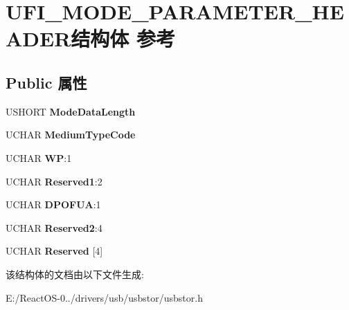 \hypertarget{struct_u_f_i___m_o_d_e___p_a_r_a_m_e_t_e_r___h_e_a_d_e_r}{}\section{U\+F\+I\+\_\+\+M\+O\+D\+E\+\_\+\+P\+A\+R\+A\+M\+E\+T\+E\+R\+\_\+\+H\+E\+A\+D\+E\+R结构体 参考}
\label{struct_u_f_i___m_o_d_e___p_a_r_a_m_e_t_e_r___h_e_a_d_e_r}
\subsection*{Public 属性}
\begin{DoxyCompactItemize}
\item 
\mbox{\label{struct_u_f_i___m_o_d_e___p_a_r_a_m_e_t_e_r___h_e_a_d_e_r_a99f4988ecff60dd0100bd52246df449d}} 
U\+S\+H\+O\+RT {\bfseries Mode\+Data\+Length}
\item 
\mbox{\label{struct_u_f_i___m_o_d_e___p_a_r_a_m_e_t_e_r___h_e_a_d_e_r_a09ae2c33e14cf02eaefda565563d7474}} 
U\+C\+H\+AR {\bfseries Medium\+Type\+Code}
\item 
\mbox{\label{struct_u_f_i___m_o_d_e___p_a_r_a_m_e_t_e_r___h_e_a_d_e_r_a0e1b2183dc0a67be1ac0c2ce4abf9b66}} 
U\+C\+H\+AR {\bfseries WP}\+:1
\item 
\mbox{\label{struct_u_f_i___m_o_d_e___p_a_r_a_m_e_t_e_r___h_e_a_d_e_r_a36c5bdbf635ca9a382cbdbbfd4e53df7}} 
U\+C\+H\+AR {\bfseries Reserved1}\+:2
\item 
\mbox{\label{struct_u_f_i___m_o_d_e___p_a_r_a_m_e_t_e_r___h_e_a_d_e_r_a8535d5f1768534e48841d221ed0dc461}} 
U\+C\+H\+AR {\bfseries D\+P\+O\+F\+UA}\+:1
\item 
\mbox{\label{struct_u_f_i___m_o_d_e___p_a_r_a_m_e_t_e_r___h_e_a_d_e_r_aac5aee1928fc25977c32c2c5205e0e40}} 
U\+C\+H\+AR {\bfseries Reserved2}\+:4
\item 
\mbox{\label{struct_u_f_i___m_o_d_e___p_a_r_a_m_e_t_e_r___h_e_a_d_e_r_a8d437791622e2464e06f26b2f32cb759}} 
U\+C\+H\+AR {\bfseries Reserved} \mbox{[}4\mbox{]}
\end{DoxyCompactItemize}


该结构体的文档由以下文件生成\+:\begin{DoxyCompactItemize}
\item 
E\+:/\+React\+O\+S-\/0../drivers/usb/usbstor/usbstor.\+h\end{DoxyCompactItemize}
